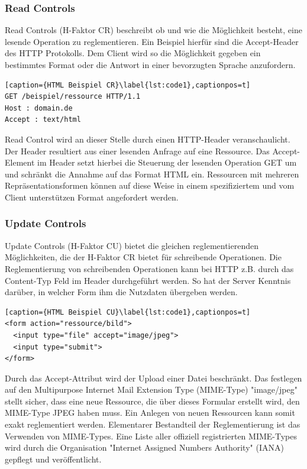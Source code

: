 \subsubsection{Read Controls}
Read Controls (H-Faktor CR) beschreibt ob und wie die Möglichkeit besteht, eine lesende Operation zu reglementieren. Ein Beispiel hierfür sind die Accept-Header des HTTP Protokolls. Dem Client wird so die Möglichkeit gegeben ein bestimmtes Format oder die Antwort in einer bevorzugten Sprache anzufordern.\\
\begin{lstlisting}[caption={HTML Beispiel CR}\label{lst:code1},captionpos=t]
GET /beispiel/ressource HTTP/1.1
Host : domain.de
Accept : text/html
\end{lstlisting}
Read Control wird an dieser Stelle durch einen HTTP-Header veranschaulicht. Der Header resultiert aus einer lesenden Anfrage auf eine Ressource. Das Accept-Element im Header setzt hierbei die Steuerung der lesenden Operation GET um und schränkt die Annahme auf das Format HTML ein. Ressourcen mit mehreren Repräsentationsformen können auf diese Weise in einem spezifiziertem und vom Client unterstützen Format angefordert werden.


\subsubsection{Update Controls}
Update Controls (H-Faktor CU) bietet die gleichen reglementierenden Möglichkeiten, die der H-Faktor CR bietet für schreibende Operationen. Die Reglementierung von schreibenden Operationen kann bei HTTP z.B. durch das Content-Typ Feld im Header durchgeführt werden. So hat der Server Kenntnis darüber, in welcher Form ihm die Nutzdaten übergeben werden.\\
\begin{lstlisting}[caption={HTML Beispiel CU}\label{lst:code1},captionpos=t]
<form action="ressource/bild">
  <input type="file" accept="image/jpeg">
  <input type="submit">
</form>
\end{lstlisting}
Durch das Accept-Attribut wird der Upload einer Datei beschränkt. Das festlegen auf den Multipurpose Internet Mail Extension Type (MIME-Type) "image/jpeg" stellt sicher, dass eine neue Ressource, die über dieses Formular erstellt wird, den MIME-Type JPEG haben muss. Ein Anlegen von neuen Ressourcen kann somit exakt reglementiert werden. Elementarer Bestandteil der Reglementierung ist das Verwenden von MIME-Types. Eine Liste aller offiziell registrierten MIME-Types wird durch die Organisation "Internet Assigned Numbers Authority" (IANA) gepflegt und veröffentlicht.


